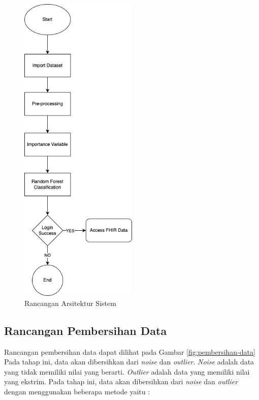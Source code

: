 \begin{figure}[H]
    \centering
    \includegraphics[width=0.5\textwidth]{contents/chapter-4/diagram-khusus.png}
    \caption{Rancangan Arsitektur Sistem}
    \label{fig:arsitektur-sistem}
\end{figure}

\subsection{Rancangan Pembersihan Data}
Rancangan pembersihan data dapat dilihat pada Gambar \ref{fig:pembersihan-data} Pada tahap ini, data akan dibersihkan dari \textit{noise} dan \textit{outlier}. \textit{Noise} adalah data yang tidak memiliki nilai yang berarti. \textit{Outlier} adalah data yang memiliki nilai yang ekstrim. Pada tahap ini, data akan dibersihkan dari \textit{noise} dan \textit{outlier} dengan menggunakan beberapa metode yaitu :

